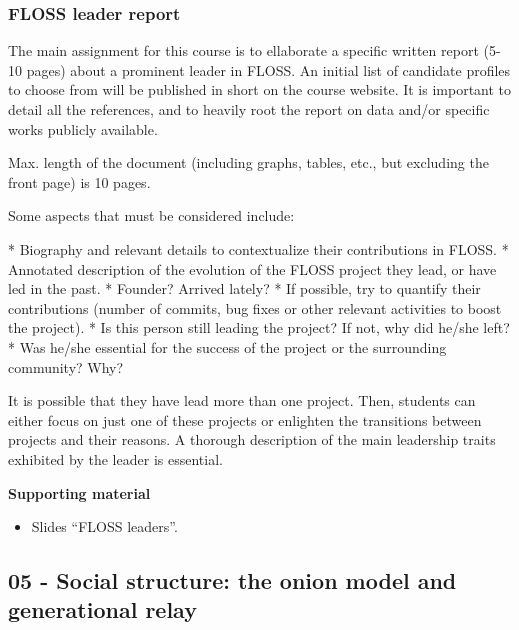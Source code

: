 \documentclass[a4paper]{article}
\begin{document}
\subsubsection{FLOSS leader report}
\label{sub:floss-leaders}

The main assignment for this course is to ellaborate a specific written report (5-10 pages) about a prominent leader in FLOSS. An initial list of 
candidate profiles to choose from will be published in short on the course website. It is important to detail all the references, and to heavily root 
the report on data and/or specific works publicly available.

Max. length of the document (including graphs, tables, etc., but excluding the front page) is 10 pages.

Some aspects that must be considered include:

    * Biography and relevant details to contextualize their contributions in FLOSS.
    * Annotated description of the evolution of the FLOSS project they lead, or have led in the past.
    * Founder? Arrived lately?
    * If possible, try to quantify their contributions (number of commits, bug fixes or other relevant activities to boost the project).
    * Is this person still leading the project? If not, why did he/she left?
    * Was he/she essential for the success of the project or the surrounding community? Why?

It is possible that they have lead more than one project. Then, students can either focus on just one of these projects or enlighten the transitions between 
projects and their reasons. A thorough description of the main leadership traits exhibited by the leader is essential.

\textbf{Supporting material}

\begin{itemize}
\item Slides ``FLOSS leaders''.
\end{itemize}

\subsection{05 - Social structure: the onion model and generational relay}

\end{document}
